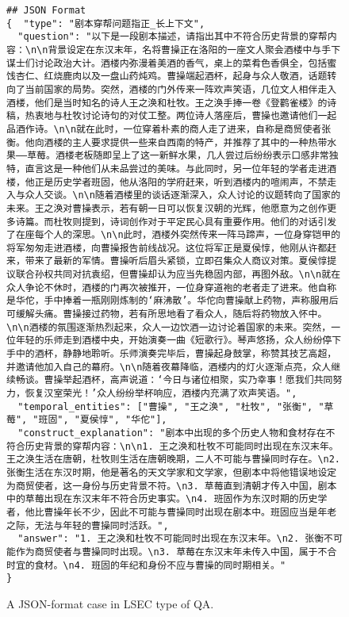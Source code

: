 \begin{figure*}[t]
\begin{tcolorbox}[title={\textbf{\small Long Script Error Correction (LSEC)}}, colback=whitesmoke, colframe=royalblue(web), boxrule=2pt, arc=0mm]
{\small
\begin{verbatim}
## JSON Format
{  "type": "剧本穿帮问题指正_长上下文", 
  "question": "以下是一段剧本描述，请指出其中不符合历史背景的穿帮内容：\n\n背景设定在东汉末年，名将曹操正在洛阳的一座文人聚会酒楼中与手下谋士们讨论政治大计。酒楼内弥漫着美酒的香气，桌上的菜肴色香俱全，包括蜜饯杏仁、红烧鹿肉以及一盘山药炖鸡。曹操端起酒杯，起身与众人敬酒，话题转向了当前国家的局势。突然，酒楼的门外传来一阵欢声笑语，几位文人相伴走入酒楼，他们是当时知名的诗人王之涣和杜牧。王之涣手捧一卷《登鹳雀楼》的诗稿，热衷地与杜牧讨论诗句的对仗工整。两位诗人落座后，曹操也邀请他们一起品酒作诗。\n\n就在此时，一位穿着朴素的商人走了进来，自称是商贸使者张衡。他向酒楼的主人要求提供一些来自西南的特产，并推荐了其中的一种热带水果——草莓。酒楼老板随即呈上了这一新鲜水果，几人尝过后纷纷表示口感非常独特，直言这是一种他们从未品尝过的美味。与此同时，另一位年轻的学者走进酒楼，他正是历史学者班固，他从洛阳的学府赶来，听到酒楼内的喧闹声，不禁走入与众人交谈。\n\n随着酒楼里的谈话逐渐深入，众人讨论的议题转向了国家的未来。王之涣对曹操表示，若有朝一日可以恢复汉朝的光辉，他愿意为之创作更多诗篇。而杜牧则提到，诗词创作对于平定民心具有重要作用。他们的对话引发了在座每个人的深思。\n\n此时，酒楼外突然传来一阵马蹄声，一位身穿铠甲的将军匆匆走进酒楼，向曹操报告前线战况。这位将军正是夏侯惇，他刚从许都赶来，带来了最新的军情。曹操听后眉头紧锁，立即召集众人商议对策。夏侯惇提议联合孙权共同对抗袁绍，但曹操却认为应当先稳固内部，再图外敌。\n\n就在众人争论不休时，酒楼的门再次被推开，一位身穿道袍的老者走了进来。他自称是华佗，手中捧着一瓶刚刚炼制的‘麻沸散’。华佗向曹操献上药物，声称服用后可缓解头痛。曹操接过药物，若有所思地看了看众人，随后将药物放入怀中。\n\n酒楼的氛围逐渐热烈起来，众人一边饮酒一边讨论着国家的未来。突然，一位年轻的乐师走到酒楼中央，开始演奏一曲《短歌行》。琴声悠扬，众人纷纷停下手中的酒杯，静静地聆听。乐师演奏完毕后，曹操起身鼓掌，称赞其技艺高超，并邀请他加入自己的幕府。\n\n随着夜幕降临，酒楼内的灯火逐渐点亮，众人继续畅谈。曹操举起酒杯，高声说道：‘今日与诸位相聚，实乃幸事！愿我们共同努力，恢复汉室荣光！’众人纷纷举杯响应，酒楼内充满了欢声笑语。",
  "temporal_entities": ["曹操", "王之涣", "杜牧", "张衡", "草莓", "班固", "夏侯惇", "华佗"],
  "construct_explanation": "剧本中出现的多个历史人物和食材存在不符合历史背景的穿帮内容：\n\n1. 王之涣和杜牧不可能同时出现在东汉末年。王之涣生活在唐朝，杜牧则生活在唐朝晚期，二人不可能与曹操同时存在。\n2. 张衡生活在东汉时期，他是著名的天文学家和文学家，但剧本中将他错误地设定为商贸使者，这一身份与历史背景不符。\n3. 草莓直到清朝才传入中国，剧本中的草莓出现在东汉末年不符合历史事实。\n4. 班固作为东汉时期的历史学者，他比曹操年长不少，因此不可能与曹操同时出现在剧本中。班固应当是年老之际，无法与年轻的曹操同时活跃。",
  "answer": "1. 王之涣和杜牧不可能同时出现在东汉末年。\n2. 张衡不可能作为商贸使者与曹操同时出现。\n3. 草莓在东汉末年未传入中国，属于不合时宜的食材。\n4. 班固的年纪和身份不应与曹操的同时期相关。"
}
\end{verbatim}
}
\end{tcolorbox}
\caption{A JSON-format case in LSEC type of QA.}
\label{fig:LSEC_case}
\end{figure*}
